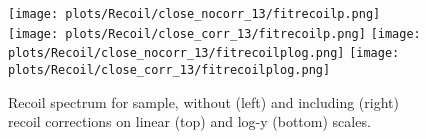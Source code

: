\begin{figure}
\centering
\texttt{[image: plots/Recoil/close\_nocorr\_13/fitrecoilp.png]}
\texttt{[image: plots/Recoil/close\_corr\_13/fitrecoilp.png]}
\texttt{[image: plots/Recoil/close\_nocorr\_13/fitrecoilplog.png]}
\texttt{[image: plots/Recoil/close\_corr\_13/fitrecoilplog.png]}
\caption{Recoil spectrum for \zmm sample, without (left) and including (right) recoil corrections on linear (top) and log-y (bottom) scales.}
\label{fig:recoil:validation:recoil}
\end{figure}